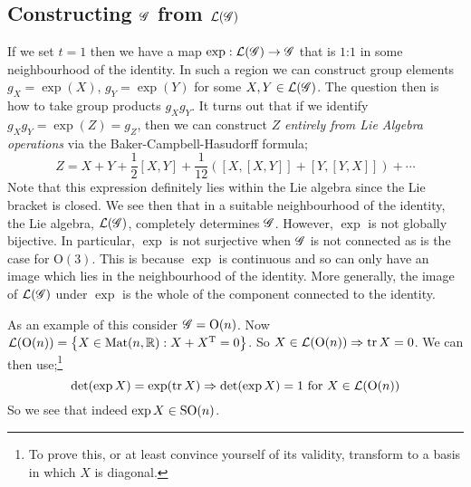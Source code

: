 \subsection{Constructing $\mathscr{G}$ from $\mathcal{L}(\mathscr{G})$}
If we set $t = 1$ then we have a map $\exp : \mathcal{L}(\mathscr{G}) \rightarrow \mathscr{G}$ that is $1$:$1$ in some neighbourhood of the identity. In such a region we can construct group elements $g_X = \exp(X)$, $g_Y = \exp(Y)$ for some $X, Y \in \mathcal{L}(\mathscr{G})$. The question then is how to take group products $g_X g_Y$. It turns out that if we identify $g_X g_Y = \exp(Z) = g_Z$, then we can construct $Z$ \emph{entirely from Lie Algebra operations} via the Baker-Campbell-Hasudorff formula;
\begin{equation}
Z = X + Y + \frac{1}{2}[X, Y] + \frac{1}{12}\left([X, [X, Y]] + [Y, [Y, X]]\right) + \cdots
\end{equation}
Note that this expression definitely lies within the Lie algebra since the Lie bracket is closed. We see then that in a suitable neighbourhood of the identity, the Lie algebra, $\mathcal{L}(\mathscr{G})$, completely determines $\mathscr{G}$. However, $\exp$ is not globally bijective. In particular, $\exp$ is not surjective when $\mathscr{G}$ is not connected as is the case for $\text{O}(3)$. This is because $\exp$ is continuous and so can only have an image which lies in the neighbourhood of the identity. More generally, the image of $\mathcal{L}(\mathscr{G})$ under $\exp$ is the whole of the component connected to the identity.

\paraskip
As an example of this consider $\mathscr{G} = \text{O}(n)$. Now $\mL\left(\text{O}(n)\right) = \set{X \in \text{Mat}(n, \RR): X + X^{\text{T}} = 0}$. So $X \in \mL\left(\text{O}(n)\right) \Rightarrow \tr X = 0$. We can then use;\footnote{To prove this, or at least convince yourself of its validity, transform to a basis in which $X$ is diagonal.}
\begin{equation*}
\det\left(\exp X\right) = \exp\left(\tr X\right) \Rightarrow \det\left(\exp X\right) = 1 \,\,\text{for}\,\,X \in \mL\left(\text{O}(n)\right)
\end{equation*}
So we see that indeed $\exp X \in \SO{n}$.

